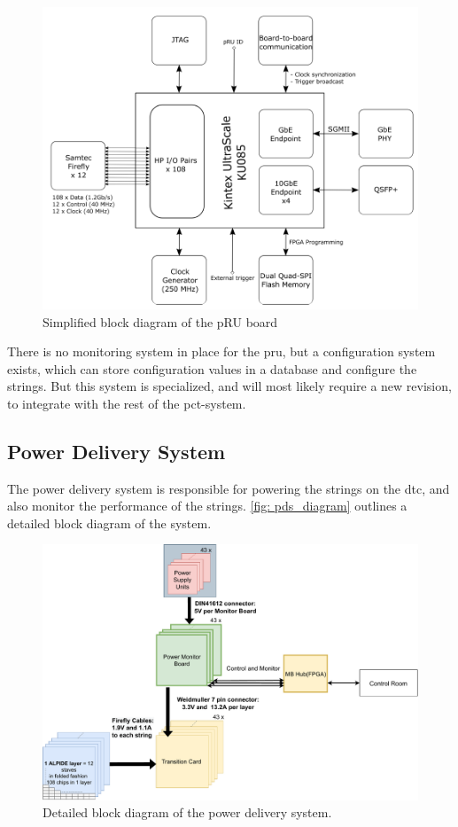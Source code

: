 \documentclass[main.tex]{subfiles}
\begin{document}
\begin{figure}[!ht]
    \centering
    \includegraphics[scale=0.5]{images/pru_diagram.png}
    \caption{Simplified block diagram of the pRU board\cite{ola}}
    \label{fig: pru_diagram}
\end{figure}
\FloatBarrier

There is no monitoring system in place for the \gls{pru}, but a configuration system exists, which can store configuration values in a database and configure the strings. But this system is specialized, and will most likely require a new revision, to integrate with the rest of the \gls{pct}-system.

\subsection{Power Delivery System}

The power delivery system is responsible for powering the strings on the \gls{dtc}, and also monitor the performance of the strings. \autoref{fig: pds_diagram} outlines a detailed block diagram of the system.

\begin{figure}[!ht]
    \centering
    \includegraphics[scale=0.5]{images/pds_detail.pdf}
    \caption{Detailed block diagram of the power delivery system.}
    \label{fig: pds_diagram}
\end{figure}
\FloatBarrier
\end{document}
